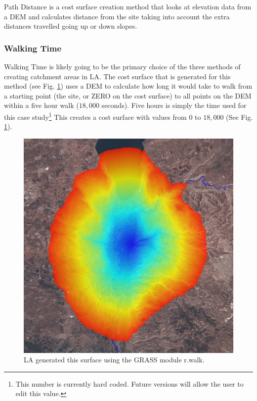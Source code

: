   Path Distance is a cost surface creation method that looks at elevation data
  from a DEM and calculates distance from the site taking into account the
  extra distances travelled going up or down slopes.

  \subsubsection{Walking Time}
  
  Walking Time is likely going to be the primary choice of the three methods of
  creating catchment areas in LA.  The cost surface that is
  generated for this method (see Fig. \ref{fig:rwalk}) uses a DEM to calculate
  how long it would take to walk from a starting point (the site, or ZERO on
  the cost surface) to all points on the DEM within a five hour walk ($18,000$
  seconds). Five hours is simply the time used for this case
  study\footnote{This number is currently hard coded. Future versions will
  allow the user to edit this value.} This creates a cost surface with values
  from $0$ to $18,000$ (See Fig. \ref{fig:rwalk}).  

\begin{figure}[htbp] \centering
\includegraphics[scale=0.29]{./images/rwalkShuna.jpg}
   \caption{\label{fig:rwalk}LA generated this surface using the GRASS module
r.walk.}
    \end{figure}


